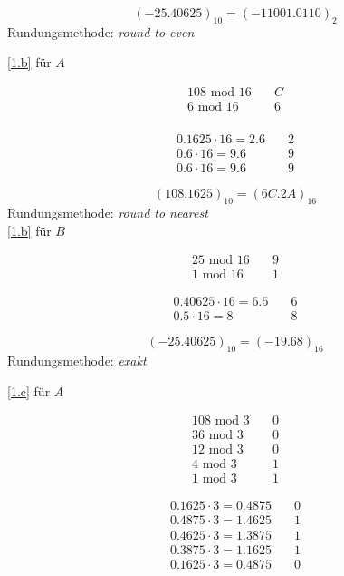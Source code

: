\documentclass[a4paper, margins=3cm, newpage]{homework}
\begin{document}
\begin{solution}
\[(-25.40625)_{10} = (-11001.0110)_2\]
Rundungsmethode: \emph{round to even} 

\ref{1.b} für \(A\) \\
\begin{minipage}{0.5\textwidth}
\begin{align*}
	108 \text{ mod } 16 \quad &C \\
	6 \text{ mod } 16 \quad &6 \\
\end{align*}
\end{minipage}
\begin{minipage}{0.5\textwidth}
\begin{align*}
	0.1625 \cdot 16 = 2.6 \quad & 2 \\
	0.6 \cdot 16 = 9.6 \quad & 9 \\
	0.6 \cdot 16 = 9.6 \quad & 9
\end{align*}
\end{minipage}

\[(108.1625)_{10} = (6C.2A)_{16}\]
Rundungsmethode: \emph{round to nearest} \\

\ref{1.b} für \(B\) \\
\begin{minipage}{0.5\textwidth}
\begin{align*}
	25 \text{ mod } 16 \quad &9 \\
	1 \text{ mod } 16 \quad &1 
\end{align*}
\end{minipage}
\begin{minipage}{0.5\textwidth}
\begin{align*}
	0.40625 \cdot 16 = 6.5 \quad & 6 \\
	0.5 \cdot 16 = 8 \quad & 8 
\end{align*}
\end{minipage}

\[(-25.40625)_{10} = (-19.68)_{16}\]
Rundungsmethode: \emph{exakt}

\ref{1.c} für \(A\) \\
\begin{minipage}{0.5\textwidth}
\begin{align*}
	108 \text{ mod } 3 \quad &0 \\
	36 \text{ mod } 3 \quad &0 \\ 
	12 \text{ mod } 3 \quad &0 \\
	4 \text{ mod } 3 \quad &1 \\
	1 \text{ mod } 3 \quad &1
\end{align*}
\end{minipage}
\begin{minipage}{0.5\textwidth}
\begin{align*}
	0.1625 \cdot 3 = 0.4875 \quad & 0 \\
	0.4875 \cdot 3 = 1.4625 \quad & 1 \\ 
	0.4625 \cdot 3 = 1.3875 \quad & 1 \\ 
	0.3875 \cdot 3 = 1.1625 \quad & 1 \\ 
	0.1625 \cdot 3 = 0.4875 \quad & 0
\end{align*}
\end{minipage}


\end{solution}
\end{document}

